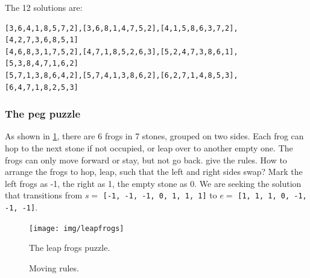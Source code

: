 \documentclass[b5paper]{article}
\begin{document}
\begin{Answer}[ref = {ex:queens-puzzle}]
{

The 12 solutions are:
\begin{Verbatim}[fontsize=\footnotesize]
[3,6,4,1,8,5,7,2],[3,6,8,1,4,7,5,2],[4,1,5,8,6,3,7,2],[4,2,7,3,6,8,5,1]
[4,6,8,3,1,7,5,2],[4,7,1,8,5,2,6,3],[5,2,4,7,3,8,6,1],[5,3,8,4,7,1,6,2]
[5,7,1,3,8,6,4,2],[5,7,4,1,3,8,6,2],[6,2,7,1,4,8,5,3],[6,4,7,1,8,2,5,3]
\end{Verbatim}
}
\end{Answer}

\subsubsection{The peg puzzle}

As shown in \cref{fig:leapfrog}, there are 6 frogs in 7 stones, grouped on two sides. Each frog can hop to the next stone if not occupied, or leap over to another empty one. The frogs can only move forward or stay, but not go back.  give the rules. How to arrange the frogs to hop, leap, such that the left and right sides swap? Mark the left frogs as -1, the right as 1, the empty stone as 0. We are seeking the solution that transitions from $s =$ \texttt{[-1, -1, -1, 0, 1, 1, 1]} to $e =$ \texttt{[1, 1, 1, 0, -1, -1, -1]}.

\begin{figure}[htbp]
 \centering
 \texttt{[image: img/leapfrogs]}
 \caption{The leap frogs puzzle.}
 \label{fig:leapfrog}
\end{figure}

\begin{figure}[htbp]
 \centering
  \hspace{0.02\textwidth}
  \hspace{0.02\textwidth}
 \caption{Moving rules.}
 \label{fig:pegrules}
\end{figure}
\end{document}
